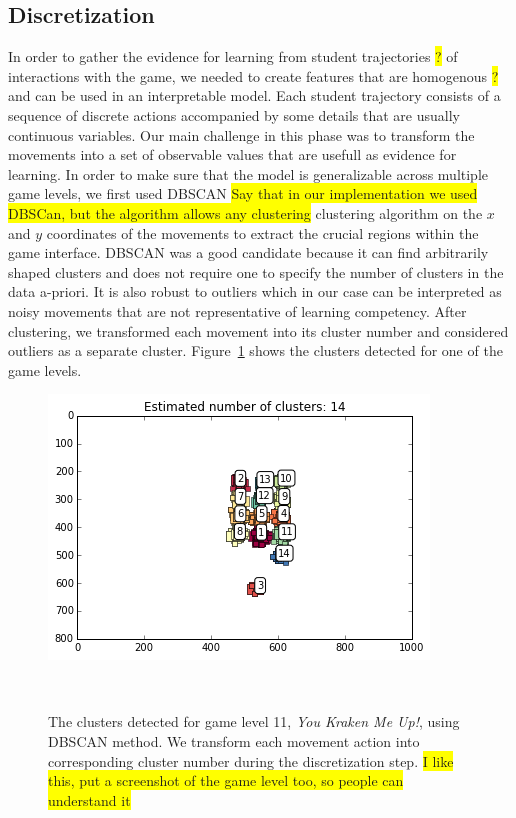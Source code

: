 \documentclass{sigchi}
\newcommand{\hl}[1]{\colorbox{yellow}{#1}}
\begin{document}
\subsection{Discretization}
In order to gather the evidence for learning from student trajectories \hl{?} of interactions with the game, we needed to create features that are homogenous \hl{?} and can be used in an interpretable model. 
Each student trajectory consists of a sequence of discrete actions accompanied by some details that are usually continuous variables. 
Our main challenge in this phase was to transform the movements into a set of observable values that are usefull as evidence for learning.
In order to make sure that the model is generalizable across multiple game levels, we first used DBSCAN \hl{Say that in our implementation we used DBSCan, but the algorithm allows any clustering} clustering algorithm \cite{ester1996density} on the $x$ and $y$ coordinates of the movements to extract the crucial regions within the game interface. 
DBSCAN was a good candidate because it can find arbitrarily shaped clusters and does not require one to specify the number of clusters in the data a-priori. 
It is also robust to outliers which in our case can be interpreted as noisy movements that are not representative of learning competency. 
After clustering, we transformed each movement into its cluster number and considered outliers as a separate cluster. 
Figure~\ref{fig:figurecluster} shows the clusters detected for one of the game levels.

\begin{figure}
	\centering
	\includegraphics[width=0.9\columnwidth]{figures/cluster}
	\caption{The clusters detected for game level 11, \textit {You Kraken Me Up!}, using DBSCAN method. We transform each movement action into corresponding cluster number during the discretization step. \hl{I like this, put a screenshot of the game level too, so people can understand it}}~\label{fig:figurecluster}
\end{figure}
\end{document}
